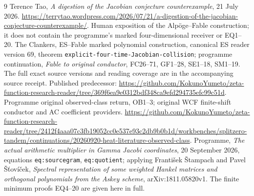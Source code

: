 \documentclass[11pt]{article}
\begin{document}
\begin{thebibliography}{9}
 Terence Tao, \emph{A digestion of the Jacobian conjecture
counterexample}, 21 July 2026.
\url{https://terrytao.wordpress.com/2026/07/21/a-digestion-of-the-jacobian-conjecture-counterexample/}.
Human exposition of the Alp\"oge--Fable construction; it does not
contain the programme's marked four-dimensional receiver or EQ1--20.
 The Clankers, ES--Fable marked polynomial construction,
canonical ES reader version 69, theorem
\texttt{explicit-four-time-Jacobian-collision}; programme continuation,
\emph{Fable to original conductor}, FC26--71, GF1--28, SE1--18,
SM1--19. The full exact source versions and reading coverage are in
the accompanying source receipt. Published predecessor:
\url{https://github.com/KokunoYumeto/zeta-function-research-reader/tree/369f6ea9e0312bdf348ca9efd294735efc99c51d}.
 Programme original observed-class return, OB1--3;
original WCF finite-shift conductor and AC coefficient providers.
\url{https://github.com/KokunoYumeto/zeta-function-research-reader/tree/2412f4aaa07c3fb19052cc0e537e93c2db9b0b1d/workbenches/splitzero-tandem/continuations/20260920-heat-literature-observed-class}.
 Programme, \emph{The actual arithmetic multiplier in
Gamma Jacobi coordinates}, 20 September 2026, equations
\texttt{eq:sourcegram}, \texttt{eq:quotient}; applying
Franti\v{s}ek \v{S}tampach and Pavel \v{S}\v{t}ov\'{i}\v{c}ek,
\emph{Spectral representation of some weighted Hankel matrices and
orthogonal polynomials from the Askey scheme}, arXiv:1811.05820v1.
The finite minimum proofs EQ4--20 are given here in full.
\end{thebibliography}
\end{document}
